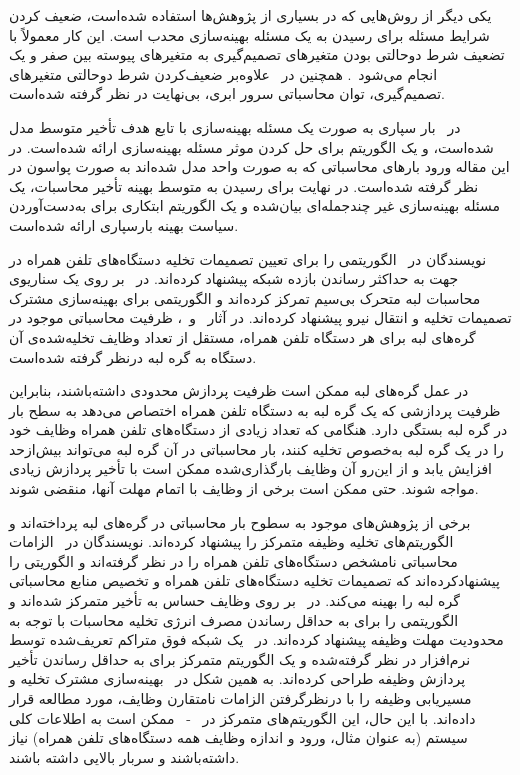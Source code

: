 یکی دیگر از روش‌هایی که در بسیاری از پژوهش‌ها استفاده شده‌است، ضعیف کردن شرایط مسئله برای رسیدن به یک مسئله بهینه‌سازی محدب است. این کار معمولاً با تضعیف شرط دوحالتی بودن متغیر‌های تصمیم‌گیری به متغیرهای پیوسته بین صفر و یک انجام می‌شود~\cite{guo2016energy}. همچنین در~\cite{sundar2018offloading} علاوه‌بر ضعیف‌کردن شرط دوحالتی متغیرهای تصمیم‌گیری، توان محاسباتی سرور ابری، بی‌نهایت در نظر گرفته شده‌است.

در~\cite{sun2017latency} بار سپاری به صورت یک مسئله بهینه‌سازی با تابع هدف تأخیر متوسط مدل شده‌است، و یک الگوریتم برای حل کردن موثر مسئله بهینه‌سازی ارائه شده‌است. در این مقاله ورود بارهای محاسباتی که به صورت واحد مدل شده‌اند به صورت پواسون در نظر گرفته شده‌است. در نهایت برای رسیدن به متوسط بهینه تأخیر محاسبات، یک مسئله بهینه‌سازی غیر چندجمله‌ای بیان‌شده و یک الگوریتم ابتکاری برای به‌دست‌آوردن سیاست بهینه بارسپاری ارائه شده‌است.




نویسندگان در~\cite{wang2017computation} الگوریتمی را برای تعیین تصمیمات تخلیه دستگاه‌های تلفن همراه در جهت به حداکثر رساندن بازده شبکه پیشنهاد کرده‌اند. در~\cite{bi2018computation} بر روی یک سناریوی محاسبات لبه متحرک بی‌سیم تمرکز کرده‌اند و الگوریتمی برای بهینه‌سازی مشترک تصمیمات تخلیه و انتقال نیرو پیشنهاد کرده‌اند. در آثار~\cite{wang2017computation} و~\cite{bi2018computation}، ظرفیت محاسباتی موجود در گره‌های لبه برای هر دستگاه تلفن همراه، مستقل از تعداد وظایف تخلیه‌شده‌ی آن دستگاه به گره لبه درنظر گرفته شده‌است.




در عمل گره‌های لبه ممکن است ظرفیت پردازش محدودی داشته‌باشند، بنابراین ظرفیت پردازشی که یک گره لبه به دستگاه تلفن همراه اختصاص می‌دهد به سطح بار در گره لبه بستگی دارد. هنگامی که تعداد زیادی از دستگاه‌های تلفن همراه وظایف خود را در یک گره لبه به‌خصوص تخلیه کنند، بار محاسباتی در آن گره لبه می‌تواند بیش‌ازحد افزایش یابد و از این‌رو آن وظایف بارگذاری‌شده ممکن است با تأخیر پردازش زیادی مواجه شوند. حتی ممکن است برخی از وظایف با اتمام مهلت آنها، منقضی شوند.

برخی از پژوهش‌های موجود به سطوح بار محاسباتی در گره‌های لبه پرداخته‌اند و الگوریتم‌های تخلیه وظیفه متمرکز را پیشنهاد کرده‌اند. نویسندگان در~\cite{eshraghi2019joint} الزامات محاسباتی نامشخص دستگاه‌های تلفن همراه را در نظر گرفته‌‌اند و الگوریتی را پیشنهادکرده‌اند که تصمیمات تخلیه دستگاه‌های تلفن همراه و تخصیص منابع محاسباتی گره لبه را بهینه می‌کند. در~\cite{lyu2018energy} بر روی وظایف حساس به تأخیر متمرکز شده‌اند و الگوریتمی را برای به حداقل رساندن مصرف انرژی تخلیه محاسبات با توجه به محدودیت مهلت وظیفه پیشنهاد کرده‌اند. در~\cite{chen2018task} یک شبکه فوق متراکم تعریف‌شده توسط نرم‌افزار در نظر گرفته‌شده و یک الگوریتم متمرکز برای به حداقل رساندن تأخیر پردازش وظیفه طراحی کرده‌اند. به همین شکل در~\cite{poularakis2019joint} بهینه‌سازی مشترک تخلیه و مسیریابی وظیفه را با درنظرگرفتن الزامات نامتقارن وظایف، مورد مطالعه قرار داده‌اند. با این حال، این الگوریتم‌های متمرکز در~\cite{eshraghi2019joint} -~\cite{poularakis2019joint} ممکن است به اطلاعات کلی سیستم (به عنوان مثال، ورود و اندازه وظایف همه دستگاه‌های تلفن همراه) نیاز داشته‌باشند و سربار بالایی داشته باشند.




